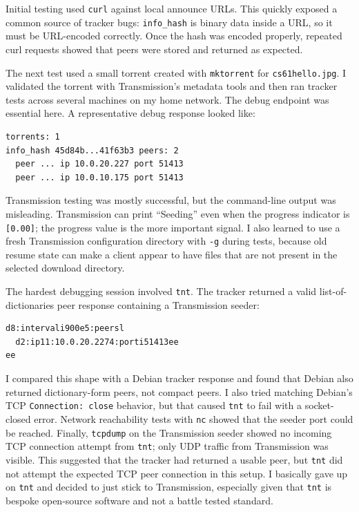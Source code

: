 \documentclass[letterpaper,twocolumn,10pt]{article}
\begin{document}
Initial testing used \texttt{curl} against local announce URLs. This quickly
exposed a common source of tracker bugs: \texttt{info\_hash} is binary data
inside a URL, so it must be URL-encoded correctly. Once the hash was encoded
properly, repeated curl requests showed that peers were stored and returned
as expected.

The next test used a small torrent created with \texttt{mktorrent} for
\texttt{cs61hello.jpg}. I validated the torrent with Transmission's metadata
tools and then ran tracker tests across several machines on my home
network. The debug endpoint was essential here. A representative debug
response looked like:

\begin{verbatim}
torrents: 1
info_hash 45d84b...41f63b3 peers: 2
  peer ... ip 10.0.20.227 port 51413
  peer ... ip 10.0.10.175 port 51413
\end{verbatim}

Transmission testing was mostly successful, but the command-line output was
misleading. Transmission can print ``Seeding'' even when the progress
indicator is \texttt{[0.00]}; the progress value is the more important
signal. I also learned to use a fresh Transmission configuration directory
with \texttt{-g} during tests, because old resume state can make a client
appear to have files that are not present in the selected download
directory.

The hardest debugging session involved \texttt{tnt}. The tracker returned a
valid list-of-dictionaries peer response containing a Transmission seeder:

\begin{verbatim}
d8:intervali900e5:peersl
  d2:ip11:10.0.20.2274:porti51413ee
ee
\end{verbatim}

\noindent
I compared this shape with a Debian tracker response and found that Debian
also returned dictionary-form peers, not compact peers. I also tried
matching Debian's TCP \texttt{Connection: close} behavior, but that caused
\texttt{tnt} to fail with a socket-closed error. Network reachability tests
with \texttt{nc} showed that the seeder port could be reached. Finally,
\texttt{tcpdump} on the Transmission seeder showed no incoming TCP
connection attempt from \texttt{tnt}; only UDP traffic from Transmission was
visible. This suggested that the tracker had returned a usable peer, but
\texttt{tnt} did not attempt the expected TCP peer connection in this setup.
I basically gave up on \texttt{tnt} and decided to just stick to Transmission,
especially given that \texttt{tnt} is bespoke open-source software and not
a battle tested standard.
\end{document}
